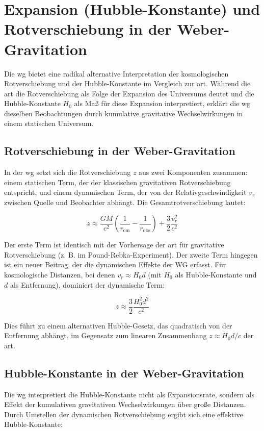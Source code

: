 \section{Expansion (Hubble-Konstante) und Rotverschiebung in der Weber-Gravitation}
Die \gls{wg} bietet eine radikal alternative Interpretation der kosmologischen Rotverschiebung und der Hubble-Konstante im Vergleich zur \gls{art}. Während die
\gls{art} die Rotverschiebung als Folge der Expansion des Universums deutet und die Hubble-Konstante $H_0$ als Maß für diese Expansion interpretiert, erklärt die \gls{wg}
dieselben Beobachtungen durch kumulative gravitative Wechselwirkungen in einem statischen Universum.

\subsection{Rotverschiebung in der Weber-Gravitation}
In der \gls{wg} setzt sich die Rotverschiebung $z$ aus zwei Komponenten zusammen: einem statischen Term, der der klassischen gravitativen Rotverschiebung entspricht, und einem
dynamischen Term, der von der Relativgeschwindigkeit $v_r$ zwischen Quelle und Beobachter abhängt. Die Gesamtrotverschiebung lautet:

\begin{equation}
    z \approx \frac{GM}{c^2} \left( \frac{1}{r_{\text{em}}} - \frac{1}{r_{\text{obs}}} \right) + \frac{3}{2} \frac{v_r^2}{c^2}
\end{equation}

Der erste Term ist identisch mit der Vorhersage der \gls{art} für gravitative Rotverschiebung (z. B. im Pound-Rebka-Experiment). Der zweite Term hingegen ist ein neuer Beitrag,
der die dynamischen Effekte der WG erfasst. Für kosmologische Distanzen, bei denen $v_r \approx H_0 d$ (mit $H_0$ als Hubble-Konstante und $d$ als Entfernung), dominiert
der dynamische Term:

\begin{equation}
    z \approx \frac{3}{2} \frac{H_0^2 d^2}{c^2}
\end{equation}

Dies führt zu einem alternativen Hubble-Gesetz, das quadratisch von der Entfernung abhängt, im Gegensatz zum linearen Zusammenhang $z \approx H_0 d / c$ der \gls{art}.

\subsection{Hubble-Konstante in der Weber-Gravitation}
Die \gls{wg} interpretiert die Hubble-Konstante nicht als Expansionsrate, sondern als Effekt der kumulativen gravitativen Wechselwirkungen über große Distanzen. Durch Umstellen
der dynamischen Rotverschiebung ergibt sich eine effektive Hubble-Konstante:

